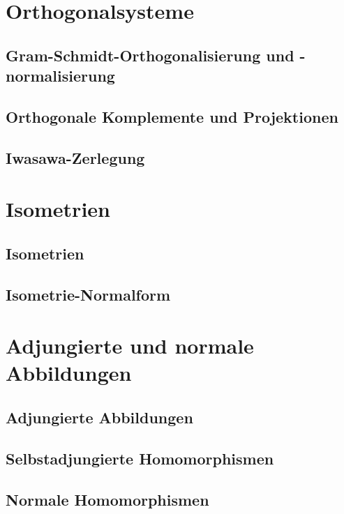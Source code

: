 \documentclass[10pt,a4paper]{article}
\begin{document}
	\section{Orthogonalsysteme}
	\subsection{Gram-Schmidt-Orthogonalisierung und -normalisierung}
	\subsection{Orthogonale Komplemente und Projektionen}
	\subsection{Iwasawa-Zerlegung}
	\section{Isometrien}
	\subsection{Isometrien}
	\subsection{Isometrie-Normalform}
	\section{Adjungierte und normale Abbildungen}
	\subsection{Adjungierte Abbildungen}
	\subsection{Selbstadjungierte Homomorphismen}
	\subsection{Normale Homomorphismen}
\end{document}
